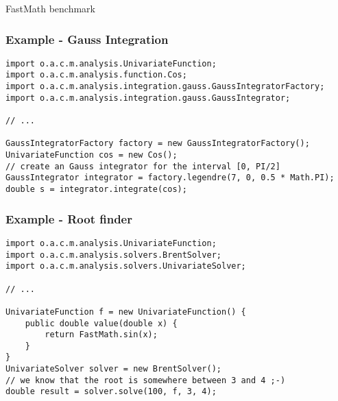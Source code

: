 \documentclass[10pt,mathserif]{beamer}
\begin{document}

\begin{frame}{FastMath benchmark}

\end{frame}

\begin{frame}[fragile]
  \frametitle{Example - Gauss Integration}

\begin{verbatim}
import o.a.c.m.analysis.UnivariateFunction;
import o.a.c.m.analysis.function.Cos;
import o.a.c.m.analysis.integration.gauss.GaussIntegratorFactory;
import o.a.c.m.analysis.integration.gauss.GaussIntegrator;

// ...

GaussIntegratorFactory factory = new GaussIntegratorFactory();
UnivariateFunction cos = new Cos();
// create an Gauss integrator for the interval [0, PI/2]
GaussIntegrator integrator = factory.legendre(7, 0, 0.5 * Math.PI);
double s = integrator.integrate(cos); 
\end{verbatim}
\end{frame}


% 
 
\begin{frame}[fragile]
  \frametitle{Example - Root finder}

\begin{verbatim}
import o.a.c.m.analysis.UnivariateFunction;
import o.a.c.m.analysis.solvers.BrentSolver;
import o.a.c.m.analysis.solvers.UnivariateSolver;

// ...

UnivariateFunction f = new UnivariateFunction() {
    public double value(double x) {
        return FastMath.sin(x);
    }
}
UnivariateSolver solver = new BrentSolver();
// we know that the root is somewhere between 3 and 4 ;-)
double result = solver.solve(100, f, 3, 4);
\end{verbatim}
\end{frame}

\end{document}
